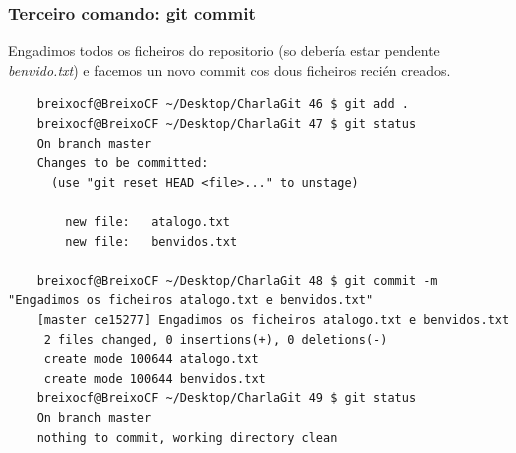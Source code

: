 \begin{frame}[fragile]
	\frametitle{Terceiro comando: git commit}
	\scriptsize
	Engadimos todos os ficheiros do repositorio (so debería estar pendente \textit{benvido.txt}) e facemos un novo commit cos dous ficheiros recién creados.
	\tiny 
	\begin{verbatim}
	breixocf@BreixoCF ~/Desktop/CharlaGit 46 $ git add .
	breixocf@BreixoCF ~/Desktop/CharlaGit 47 $ git status
	On branch master
	Changes to be committed:
	  (use "git reset HEAD <file>..." to unstage)
	
		new file:   atalogo.txt
		new file:   benvidos.txt
	
	breixocf@BreixoCF ~/Desktop/CharlaGit 48 $ git commit -m "Engadimos os ficheiros atalogo.txt e benvidos.txt"
	[master ce15277] Engadimos os ficheiros atalogo.txt e benvidos.txt
	 2 files changed, 0 insertions(+), 0 deletions(-)
	 create mode 100644 atalogo.txt
	 create mode 100644 benvidos.txt
	breixocf@BreixoCF ~/Desktop/CharlaGit 49 $ git status
	On branch master
	nothing to commit, working directory clean
	
	\end{verbatim}
	\scriptsize 
\end{frame}

